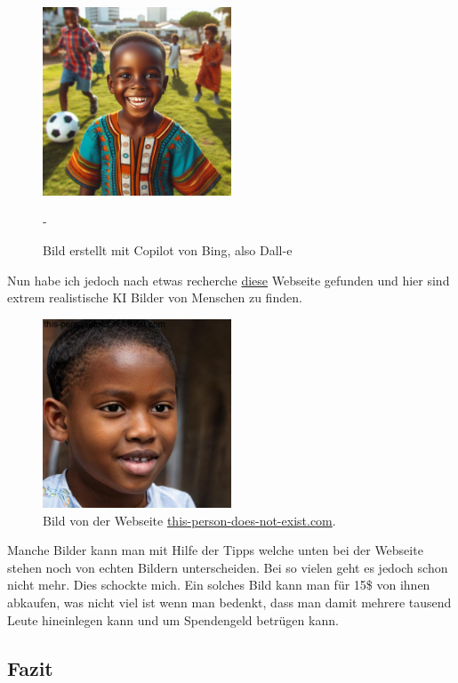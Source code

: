 \begin{figure}[H]
    \centering
    \includegraphics[width=0.5\textwidth]{copilot(dall-e).jpeg}
    \caption{Bild erstellt mit Copilot von Bing, also Dall-e}-
    \label{fig:copilot(dall-e)}
\end{figure}

Nun habe ich jedoch nach etwas recherche \href{https://this-person-does-not-exist.com}{diese} Webseite gefunden und hier sind extrem realistische KI Bilder von Menschen zu finden.
\begin{figure}[h]
    \centering
    \includegraphics[width=0.5\textwidth]{this_person_does_not_exist.jpeg}
    \caption{Bild von der Webseite \href{https://this-person-does-not-exist.com}{this-person-does-not-exist.com}.}
    \label{fig:this_person_does_not_exist}
\end{figure}
Manche Bilder kann man mit Hilfe der Tipps welche unten bei der Webseite stehen noch von echten Bildern unterscheiden. Bei so vielen geht es jedoch schon nicht mehr. Dies schockte mich. Ein solches Bild kann man für 15\$ von ihnen abkaufen, was nicht viel ist wenn man bedenkt, dass man damit mehrere tausend Leute hineinlegen kann und um Spendengeld betrügen kann.
\subsection{Fazit}

